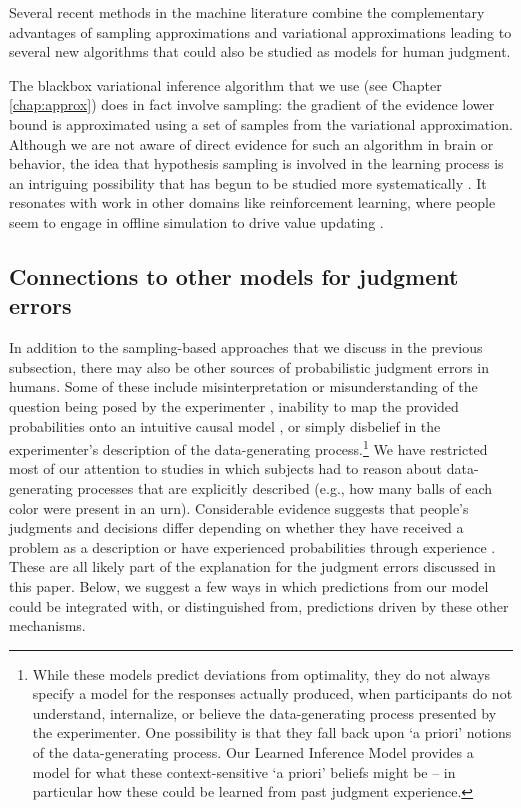 Several recent methods in the machine literature combine the complementary advantages of sampling approximations and variational approximations leading to several new algorithms \citep{li2017approximate, naesseth2017variational, ruiz2019contrast} that could also be studied as models for human judgment.

The blackbox variational inference algorithm that we use (see Chapter \ref{chap:approx}) does in fact involve sampling: the gradient of the evidence lower bound is approximated using a set of samples from the variational approximation. Although we are not aware of direct evidence for such an algorithm in brain or behavior, the idea that hypothesis sampling is involved in the learning process is an intriguing possibility that has begun to be studied more systematically \citep{bramley2017formalizing,bramley2018grounding,rule2018learning}. It resonates with work in other domains like reinforcement learning, where people seem to engage in offline simulation to drive value updating \citep{gershman2014retrospective,gershman2017imaginative,momennejad2018offline}.

\subsection{Connections to other models for judgment errors}

In addition to the sampling-based approaches that we discuss in the previous subsection, there may also be other sources of probabilistic judgment errors in humans. Some of these include misinterpretation or misunderstanding of the question being posed by the experimenter \citep{villejoubert2002inverse}, inability to map the provided probabilities onto an intuitive causal model \citep{krynski2007role}, or simply disbelief in the experimenter's description of the data-generating process.\footnote{While these models predict deviations from optimality, they do not always specify a model for the responses actually produced, when participants do not understand, internalize, or believe the data-generating process presented by the experimenter. One possibility is that they fall back upon `a priori' notions of the data-generating process. Our Learned Inference Model provides a model for what these context-sensitive `a priori' beliefs might be -- in particular how these could be learned from past judgment experience.} We have restricted most of our attention to studies in which subjects had to reason about data-generating processes that are explicitly described (e.g., how many balls of each color were present in an urn). Considerable evidence suggests that people's judgments and decisions differ depending on whether they have received a problem as a description or have experienced probabilities through experience \citep{hertwig2009description,hertwig2018experience}. These are all likely part of the explanation for the judgment errors discussed in this paper. Below, we suggest a few ways in which predictions from our model could be integrated with, or distinguished from, predictions driven by these other mechanisms. 
 

